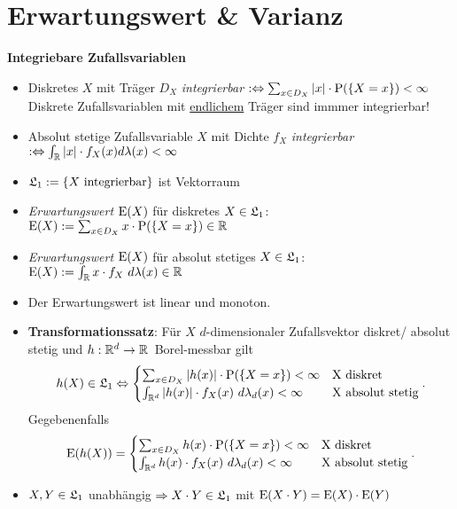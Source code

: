\section{Erwartungswert \& Varianz}

\textbf{Integriebare Zufallsvariablen}
\begin{itemize}
\item Diskretes $X$ mit Träger $D_X$ \textit{integrierbar}
$:\Leftrightarrow \sum_{x\in D_X} |x|\cdot \P(\{X=x\})<\infty$\\
Diskrete Zufallsvariablen mit \underline{endlichem} Träger sind immmer integrierbar!

\item  Absolut stetige Zufallsvariable $X$ mit Dichte $f_X$ \textit{integrierbar}
\mbox{$:\Leftrightarrow \int_\R |x|\cdot f_X(x)d\lambda(x)<\infty$}

\item $\L_1:=\{X \text{ integrierbar}\}$ ist Vektorraum

\item \textit{Erwartungswert $\E(X)$} für diskretes $X\in\L_1$:
$\E(X):= \sum_{x\in D_X} x\cdot\P(\{X=x\})\in\R$

\item \textit{Erwartungswert $\E(X)$} für absolut stetiges $X\in\L_1$:
$\E(X):= \int_\R x\cdot f_X~d\lambda(x)\in\R$

\item Der Erwartungswert ist linear und monoton.

\item \textbf{Transformationssatz}: Für $X$ $d$-dimensionaler Zufallsvektor diskret/
absolut stetig und \mbox{$h:\R^d\to\R$ Borel-messbar} gilt
\[
	h(X)\in\L_1 \Leftrightarrow
	\begin{cases}
	\sum_{x\in D_X} |h(x)|\cdot\P(\{X=x\})<\infty			& \text{X diskret} \\
	\int_{\R^d} |h(x)|\cdot f_X(x)~d\lambda_d(x)<\infty	& \text{X absolut stetig}
	\end{cases}.
\]
Gegebenenfalls
\[
	\E(h(X))=
	\begin{cases}
	\sum_{x\in D_X} h(x)\cdot\P(\{X=x\})<\infty			& \text{X diskret} \\
	\int_{\R^d} h(x)\cdot f_X(x)~d\lambda_d(x)<\infty		& \text{X absolut stetig}
	\end{cases}.
\]

\item $X,Y\in\L_1$ \hypertarget{unabhaengig}{unabhängig}
$\Rightarrow X\cdot Y\in\L_1$ mit $\E(X\cdot Y) = \E(X)\cdot \E(Y)$

\end{itemize}
\hspace{3em}

